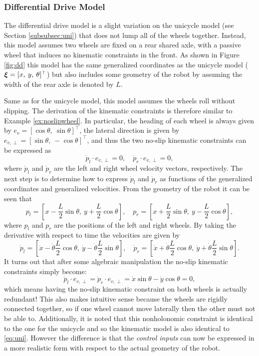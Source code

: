 \subsubsection{Differential Drive Model}
The differential drive model is a slight variation on the unicycle model (see Section \ref{subsubsec:uni}) that does not lump all of the wheels together. Instead, this model assumes two wheels are fixed on a rear shared axle, with a passive wheel that induces no kinematic constraints in the front.
As shown in Figure \ref{fig:dd} this model has the same generalized coordinates as the unicycle model ($\bm{\xi} = [x,\:y,\:\theta]^\top $) but also includes some geometry of the robot by assuming the width of the rear axle is denoted by $L$.

Same as for the unicycle model, this model assumes the wheels roll without slipping. The derivation of the kinematic constraints is therefore similar to Example \ref{ex:noslipwheel}. In particular, the heading of each wheel is always given by $e_v = [\cos \theta, \: \sin \theta]^\top $, the lateral direction is given by $e_{v,\perp} = [\sin \theta, \: -\cos \theta]^\top $, and thus the two no-slip kinematic constraints can be expressed as
\begin{equation*}
\dot{p}_l \cdot e_{v,\perp} = 0, \quad \dot{p}_r \cdot e_{v,\perp} = 0,
\end{equation*}
where $\dot{p}_l$ and $\dot{p}_r$ are the left and right wheel velocity vectors, respectively. The next step is to determine how to express $\dot{p}_l$ and $\dot{p}_r$ as functions of the generalized coordinates and generalized velocities. From the geometry of the robot it can be seen that
\begin{equation*}
p_l = [x - \frac{L}{2}\sin \theta, \: y + \frac{L}{2}\cos \theta], \quad p_r = [x + \frac{L}{2}\sin \theta, \: y - \frac{L}{2}\cos \theta],
\end{equation*}
where $p_l$ and $p_r$ are the positions of the left and right wheels. By taking the derivative with respect to time the velocities are given by
\begin{equation*}
\dot{p}_l = [\dot{x} - \dot{\theta}\frac{L}{2}\cos \theta, \: \dot{y} - \dot{\theta}\frac{L}{2}\sin \theta], \quad \dot{p}_r = [\dot{x} + \dot{\theta}\frac{L}{2}\cos \theta, \: \dot{y} + \dot{\theta}\frac{L}{2}\sin \theta].
\end{equation*}
It turns out that after some algebraic manipulation the no-slip kinematic constraints simply become:
\begin{equation*}
\dot{p}_l \cdot e_{v,\perp} = \dot{p}_r \cdot e_{v,\perp} = \dot{x}\sin \theta - \dot{y} \cos \theta = 0,
\end{equation*}
which means having the no-slip kinematic constraint on both wheels is actually redundant! This also makes intuitive sense because the wheels are rigidly connected together, so if one wheel cannot move laterally then the other must not be able to. Additionally, it is noted that this nonholonomic constraint is identical to the one for the unicycle and so the kinematic model is also identical to \eqref{eq:uni}. However the difference is that the \textit{control inputs} can now be expressed in a more realistic form with respect to the actual geometry of the robot.

